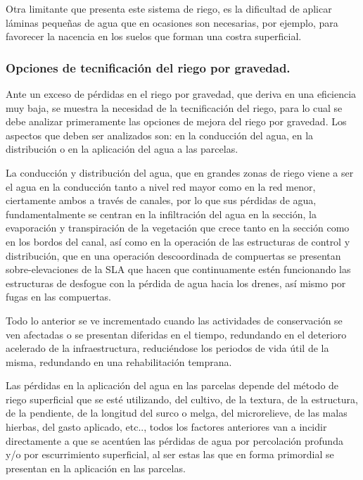 Otra limitante que presenta este sistema de riego, es la dificultad de aplicar
láminas pequeñas de agua que en ocasiones son necesarias, por ejemplo, para
favorecer la nacencia en los suelos que forman una costra superficial.


\subsubsection{Opciones de tecnificación del riego por gravedad.}

Ante un exceso de pérdidas en el riego por gravedad, que deriva en una
eficiencia muy baja, se muestra la necesidad de la tecnificación del riego, para lo cual
se debe analizar primeramente las opciones de mejora del riego por gravedad. Los
aspectos que deben ser analizados son: en la conducción del agua, en la distribución o
en la aplicación del agua a las parcelas.

La conducción y distribución del agua, que en grandes zonas de riego viene a ser
el agua en la conducción tanto a nivel red mayor como en la red menor, ciertamente
ambos a través de canales, por lo que sus pérdidas de agua, fundamentalmente se
centran en la infiltración del agua en la sección, la evaporación y transpiración de la
vegetación que crece tanto en la sección como en los bordos del canal, así como en la
operación de las estructuras de control y distribución, que en una operación
descoordinada de compuertas se presentan sobre-elevaciones de la SLA que hacen
que continuamente estén funcionando las estructuras de desfogue con la pérdida de
agua hacia los drenes, así mismo por fugas en las compuertas.

Todo lo anterior se ve incrementado cuando las actividades de conservación se
ven afectadas o se presentan diferidas en el tiempo, redundando en el deterioro
acelerado de la infraestructura, reduciéndose los periodos de vida útil de la misma,
redundando en una rehabilitación temprana.

Las pérdidas en la aplicación del agua en las parcelas depende del método de
riego superficial que se esté utilizando, del cultivo, de la textura, de la estructura, de la
pendiente, de la longitud del surco o melga, del microrelieve, de las malas hierbas, del
gasto aplicado, etc.., todos los factores anteriores van a incidir directamente a que se
acentúen las pérdidas de agua por percolación profunda y/o por escurrimiento
superficial, al ser estas las que en forma primordial se presentan en la aplicación en las
parcelas.


